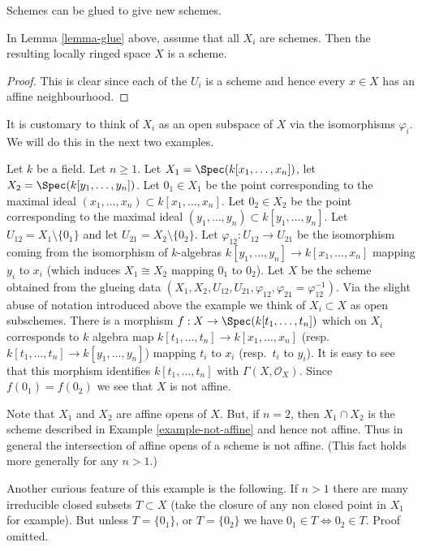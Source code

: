 \begin{lemma}
\label{lemma-glue-schemes}
\begin{slogan}
Schemes can be glued to give new schemes.
\end{slogan}
In Lemma \ref{lemma-glue} above, assume that all
$X_i$ are schemes. Then the resulting locally ringed
space $X$ is a scheme.
\end{lemma}

\begin{proof}
This is clear since each of the $U_i$ is a scheme
and hence every $x \in X$ has an affine neighbourhood.
\end{proof}

\noindent
It is customary to think of $X_i$ as an open subspace of
$X$ via the isomorphisms $\varphi_i$. We will do this in
the next two examples.

\begin{example}
\label{example-affine-space-zero-doubled}
Let $k$ be a field. Let $n \geq 1$.
Let $X_1 = \Spec(k[x_1, \ldots, x_n])$,
let $X_2 = \Spec(k[y_1, \ldots, y_n])$.
Let $0_1 \in X_1$ be the point corresponding to the maximal ideal
$(x_1, \ldots, x_n) \subset k[x_1, \ldots, x_n]$.
Let $0_2 \in X_2$ be the point corresponding to the maximal ideal
$(y_1, \ldots, y_n) \subset k[y_1, \ldots, y_n]$.
Let $U_{12} = X_1 \setminus \{0_1\}$ and
let $U_{21} = X_2 \setminus \{0_2\}$. Let
$\varphi_{12} : U_{12} \to U_{21}$ be the isomorphism
coming from the isomorphism of $k$-algebras
$k[y_1, \ldots, y_n] \to k[x_1, \ldots, x_n]$
mapping $y_i$ to $x_i$ (which induces $X_1 \cong X_2$ mapping
$0_1$ to $0_2$).
Let $X$ be the scheme obtained from the glueing data
$(X_1, X_2, U_{12}, U_{21}, \varphi_{12},
\varphi_{21} = \varphi_{12}^{-1})$. Via the slight abuse
of notation introduced above the example we think of
$X_i \subset X$ as open subschemes.
There is a morphism $f : X \to \Spec(k[t_1, \ldots, t_n])$
which on $X_i$ corresponds to $k$ algebra map
$k[t_1, \ldots, t_n] \to k[x_1, \ldots, x_n]$
(resp.\ $k[t_1, \ldots, t_n] \to k[y_1, \ldots, y_n]$)
mapping $t_i$ to $x_i$ (resp.\  $t_i$ to $y_i$).
It is easy to see that this morphism identifies
$k[t_1, \ldots, t_n]$ with $\Gamma(X, \mathcal{O}_X)$. Since
$f(0_1) = f(0_2)$ we see that $X$ is not affine.

\medskip\noindent
Note that $X_1$ and $X_2$ are affine opens of $X$.
But, if $n = 2$, then $X_1 \cap X_2$ is the scheme
described in Example \ref{example-not-affine} and hence not affine.
Thus in general the intersection of affine opens of a scheme
is not affine. (This fact holds more generally for any $n > 1$.)

\medskip\noindent
Another curious feature of this example is the following.
If $n > 1$ there are many irreducible closed subsets $T \subset X$
(take the closure of any non closed point in $X_1$ for example).
But unless $T = \{0_1\}$, or $T = \{0_2\}$ we have
$0_1 \in T \Leftrightarrow 0_2 \in T$. Proof omitted.
\end{example}

